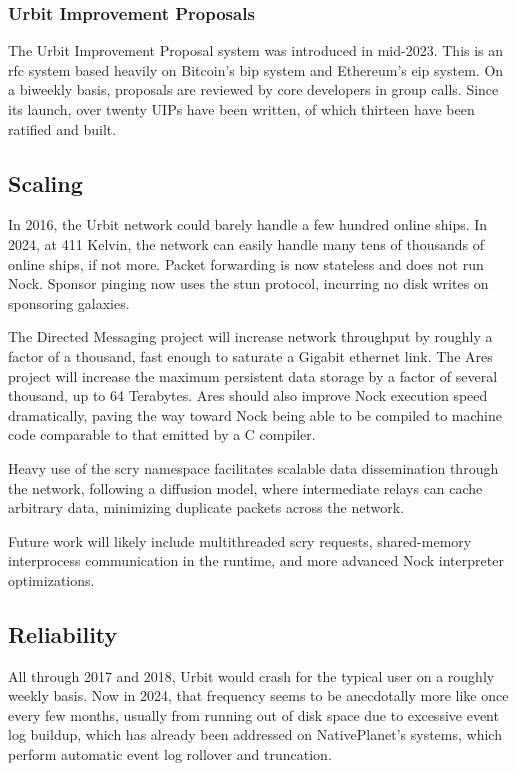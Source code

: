 \documentclass[twoside]{article}
\begin{document}
\subsubsection{Urbit Improvement Proposals}

The Urbit Improvement Proposal system was introduced in mid-2023.  This is an {\sc rfc} system based heavily on Bitcoin's {\sc bip} system and Ethereum's {\sc eip} system.  On a biweekly basis, proposals are reviewed by core developers in group calls.  Since its launch, over twenty UIPs have been written, of which thirteen have been ratified and built.

\subsection{Scaling}

In 2016, the Urbit network could barely handle a few hundred online ships.  In 2024, at 411 Kelvin, the network can easily handle many tens of thousands of online ships, if not more.  Packet forwarding is now stateless and does not run Nock.  Sponsor pinging now uses the {\sc stun} protocol, incurring no disk writes on sponsoring galaxies.

The Directed Messaging project will increase network throughput by roughly a factor of a thousand, fast enough to saturate a Gigabit ethernet link.  The Ares project will increase the maximum persistent data storage by a factor of several thousand, up to 64 Terabytes.  Ares should also improve Nock execution speed dramatically, paving the way toward Nock being able to be compiled to machine code comparable to that emitted by a C compiler.

Heavy use of the scry namespace facilitates scalable data dissemination through the network, following a diffusion model, where intermediate relays can cache arbitrary data, minimizing duplicate packets across the network.

Future work will likely include multithreaded scry requests, shared-memory interprocess communication in the runtime, and more advanced Nock interpreter optimizations.

\subsection{Reliability}

All through 2017 and 2018, Urbit would crash for the typical user on a roughly weekly basis.  Now in 2024, that frequency seems to be anecdotally more like once every few months, usually from running out of disk space due to excessive event log buildup, which has already been addressed on NativePlanet's systems, which perform automatic event log rollover and truncation.
\end{document}
